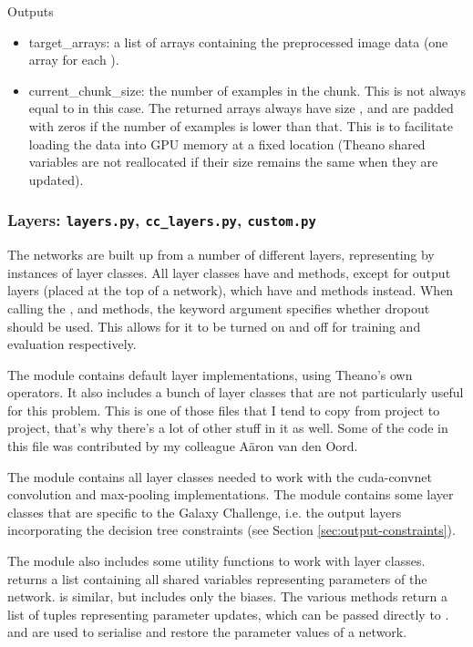 \documentclass[a4paper,10pt]{article}
\begin{document}
Outputs
 \begin{itemize}
  \item{target\_arrays:} a list of arrays containing the preprocessed image data (one array for each ).
  \item{current\_chunk\_size:} the number of examples in the chunk. This is not always equal to  in this case. The returned arrays always have size , and are padded with zeros if the number of examples is lower than that. This is to facilitate loading the data into GPU memory at a fixed location (Theano shared variables are not reallocated if their size remains the same when they are updated).
 \end{itemize}

\subsubsection{Layers: \texttt{layers.py}, \texttt{cc\_layers.py}, \texttt{custom.py}}

The networks are built up from a number of different layers, representing by instances of layer classes. All layer classes have  and  methods, except for output layers (placed at the top of a network), which have  and  methods instead. When calling the ,  and  methods, the keyword argument  specifies whether dropout should be used. This allows for it to be turned on and off for training and evaluation respectively.

The  module contains default layer implementations, using Theano's own operators. It also includes a bunch of layer classes that are not particularly useful for this problem. This is one of those files that I tend to copy from project to project, that's why there's a lot of other stuff in it as well. Some of the code in this file was contributed by my colleague A\"aron van den Oord.

The  module contains all layer classes needed to work with the cuda-convnet convolution and max-pooling implementations. The  module contains some layer classes that are specific to the Galaxy Challenge, i.e. the output layers incorporating the decision tree constraints (see Section \ref{sec:output-constraints}).

The  module also includes some utility functions to work with layer classes.  returns a list containing all shared variables representing parameters of the network.  is similar, but includes only the biases. The various  methods return a list of tuples representing parameter updates, which can be passed directly to .  and  are used to serialise and restore the parameter values of a network.
\end{document}
